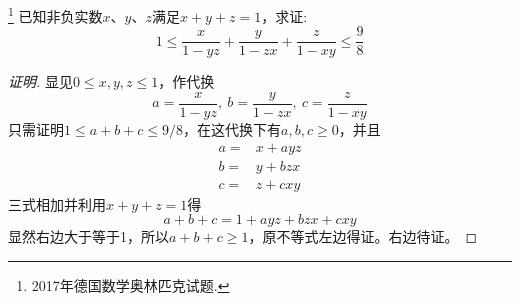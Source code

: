 \begin{exercise}\footnote{2017年德国数学奥林匹克试题.}
  已知非负实数$x$、$y$、$z$满足$x+y+z=1$，求证:
  \[ 1 \leqslant \frac{x}{1-yz}+\frac{y}{1-zx}+\frac{z}{1-xy} \leqslant \frac{9}{8} \]
\end{exercise}

\begin{proof}[证明]
  显见$0 \leqslant x,y,z \leqslant 1$，作代换
  \[ a=\frac{x}{1-yz}, \  b=\frac{y}{1-zx}, \  c=\frac{z}{1-xy} \]
  只需证明$1\leqslant a+b+c \leqslant 9/8$，在这代换下有$a,b,c \geqslant 0$，并且
  \begin{align*}
    a = {} & x+ayz \\
    b = {} & y+bzx \\
    c = {} & z+cxy
  \end{align*}
  三式相加并利用$x+y+z=1$得
  \[ a+b+c=1+ayz+bzx+cxy \]
  显然右边大于等于1，所以$a+b+c\geqslant 1$，原不等式左边得证。右边待证。
\end{proof}

